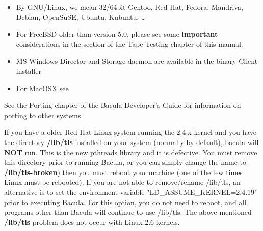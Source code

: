 \begin{itemize}
\item By GNU/Linux, we mean 32/64bit Gentoo, Red Hat, Fedora, Mandriva,
    Debian, OpenSuSE, Ubuntu, Kubuntu, \dots

\item For FreeBSD older than version 5.0,
  please see some {\bf important} considerations in the
    section of the
  Tape Testing chapter of this manual.

\item MS Windows Director and Storage daemon are available
      in the binary Client installer

\item For MacOSX see 
\end{itemize}

See the Porting chapter of the Bacula Developer's Guide for information on
porting to other systems.

If you have a older Red Hat Linux system running the 2.4.x kernel and you have
the directory {\bf /lib/tls} installed on your system (normally by default),
bacula will {\bf NOT} run. This is the new pthreads library and it is
defective. You must remove this directory prior to running Bacula, or you can
simply change the name to {\bf /lib/tls-broken}) then you must reboot your
machine (one of the few times Linux must be rebooted). If you are not able to
remove/rename /lib/tls, an alternative is to set the environment variable
"LD\_ASSUME\_KERNEL=2.4.19" prior to executing Bacula. For this option, you do
not need to reboot, and all programs other than Bacula will continue to use
/lib/tls.
The above mentioned {\bf /lib/tls} problem does not occur with Linux 2.6 kernels.

